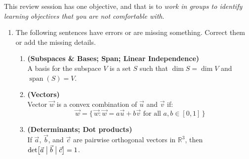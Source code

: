 \documentclass[red]{tutorial}
\newcommand{\R}{\mathbb{R}}
\newcommand{\mute}[1]{}
\DeclareMathOperator{\Span} {span}
\theoremstyle{definition}
\theoremstyle{theorem}
\begin{document}
\begin{tutorial}
  \begin{objectives}
    This review session has one objective, and that is to
    \emph{work in groups to identify learning objectives that you
    are not comfortable with}.
  \end{objectives}
  \begin{enumerate}
    \item \label{q:mistake}
      The following sentences have errors or are missing something. Correct
      them or add the missing details.
      \begin{enumerate}
          \mute{
        \item \textbf{(Linear Transformations)}\\
          A transformation $f\colon\R^n\to \R^m$ is linear if
          it sends sums to sums, $f(\vec0) = \vec0$, and
          $f(\alpha \vec x) = \alpha f(\vec x)$.
        \item
          An $n\times m$ matrix corresponds to a linear
          transformation from $\R^n$
          to $\R^m$.
        }
        \item \textbf{(Subspaces \& Bases; Span; Linear Independence)}\\
          A basis for the subspace $V$ is a set $S$
          such that $\dim S = \dim V$ and $\Span(S) = V$.
        \item \textbf{(Vectors)}\\
          Vector $\vec w$ is a convex combination of $\vec u$ and $\vec v$ if:
          \begin{equation*}
            \vec w =
            \bigl\{\,\vec w:\vec w = a\vec u %
            +b\vec v \text{ for all } a,b\in [0,1]\,
            \bigr\}
          \end{equation*}
        \item \textbf{(Determinants; Dot products)} \\
          If $\vec a$, $\vec b$, and $\vec c$ are pairwise orthogonal
          vectors in $\R^3$, then
          $\det \bigl[\vec a\bigm|\vec b\bigm|\vec c\bigr] = 1$.

\end{enumerate}
\end{enumerate}
\end{tutorial}
\end{document}
